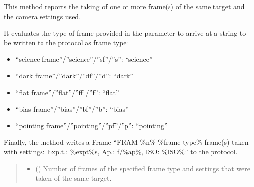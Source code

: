 \documentclass[letterpaper,10pt,english]{sphinxmanual}
\begin{document}
\begin{fulllineitems}

\begin{fulllineitems}
\label{\detokenize{autoapi/aop/aop/index:aop.aop.Session.take_frame}}
\pysigstartsignatures
{}
\pysigstopsignatures
\sphinxAtStartPar
This method reports the taking of one or more frame(s) of the same target and the camera settings used.

\sphinxAtStartPar
It evaluates the type of frame provided in the  parameter to
arrive at a string to be written to the protocol as frame type:
\begin{itemize}
\item {} 
\sphinxAtStartPar
“science frame”/”science”/”sf”/”s”: “science”

\item {} 
\sphinxAtStartPar
“dark frame”/”dark”/”df”/”d”: “dark”

\item {} 
\sphinxAtStartPar
“flat frame”/”flat”/”ff”/”f”: “flat”

\item {} 
\sphinxAtStartPar
“bias frame”/”bias”/”bf”/”b”: “bias”

\item {} 
\sphinxAtStartPar
“pointing frame”/”pointing”/”pf”/”p”: “pointing”

\end{itemize}

\sphinxAtStartPar
Finally, the method writes a Frame “FRAM \%n\% \%frame type\% frame(s)
taken with settings: Exp.t.: \%expt\%s, Ap.: f/\%ap\%, ISO: \%ISO\%” to the
protocol.
\begin{quote}\begin{description}
\begin{itemize}
\item {} 
\sphinxAtStartPar
{} () \textendash{} Number of frames of the specified frame type and settings that were
taken of the same target.


\end{itemize}
\end{description}
\end{quote}
\end{fulllineitems}
\end{fulllineitems}
\end{document}
